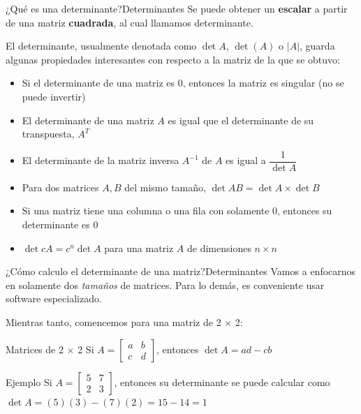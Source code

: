 \documentclass[spanish, c]{beamer}
\begin{document}
\begin{frame}{¿Qué es una determinante?}{Determinantes}
    Se puede obtener un \textbf{escalar} a partir de una matriz \textbf{cuadrada}, al cual llamamos \alert{determinante}.

    El determinante, usualmente denotada como $\det A$, $\det(A)$ o $|A|$, guarda algunas propiedades interesantes con respecto a la matriz de la que se obtuvo: \pause

    \begin{itemize}[<+->]
        \item Si el determinante de una matriz es 0, entonces la matriz es singular (no se puede invertir)
        \item El determinante de una matriz $A$ es igual que el determinante de su transpuesta, $A^T$
        \item El determinante de la matriz inversa $A^{-1}$ de $A$ es igual a $\dfrac{1}{\det A}$
        \item Para dos matrices $A, B$ del mismo tamaño, $\det AB = \det A \times \det B$
        \item Si una matriz tiene una columna o una fila con solamente 0, entonces su determinante es 0
        \item $\det cA = c^n \det A$ para una matriz $A$ de dimensiones $n \times n$
    \end{itemize}
\end{frame}

\begin{frame}{¿Cómo calculo el determinante de una matriz?}{Determinantes}
    Vamos a enfocarnos en solamente dos \textit{tamaños} de matrices. Para lo demás, es conveniente usar software especializado.
    
    Mientras tanto, comencemos para una matriz de 2 $\times$ 2: \pause

\begin{block}{Matrices de 2 $\times$ 2}
    Si $A = \begin{bmatrix*} a & b \\ c & d \end{bmatrix*}$, entonces $\det A = ad - cb$
\end{block} \pause

\begin{exampleblock}{Ejemplo}
    Si $A = \begin{bmatrix}5 & 7 \\ 2 & 3 \end{bmatrix}$,
        entonces su determinante se puede calcular como
        $\det A = (5)(3) - (7)(2) = 15 - 14 = 1$
\end{exampleblock}

\end{frame}
\end{document}
